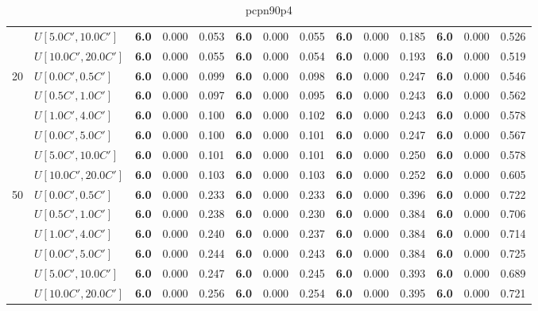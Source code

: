 \begin{table}[h]
{\begin{tabular}{|l|l||l|l|l||l|l|l||l|l|l||l|l|l|}
       & $U[5.0C',10.0C']$ & \textbf{6.0} & 0.000 & 0.053 & \textbf{6.0} & 0.000 & 0.055 & \textbf{6.0} & 0.000 & 0.185 & \textbf{6.0} & 0.000 & 0.526 \\
       & $U[10.0C',20.0C']$ & \textbf{6.0} & 0.000 & 0.055 & \textbf{6.0} & 0.000 & 0.054 & \textbf{6.0} & 0.000 & 0.193 & \textbf{6.0} & 0.000 & 0.519 \\
      \hline\hline
      \multirow{6}{*}{20} & $U[0.0C',0.5C']$ & \textbf{6.0} & 0.000 & 0.099 & \textbf{6.0} & 0.000 & 0.098 & \textbf{6.0} & 0.000 & 0.247 & \textbf{6.0} & 0.000 & 0.546 \\
       & $U[0.5C',1.0C']$ & \textbf{6.0} & 0.000 & 0.097 & \textbf{6.0} & 0.000 & 0.095 & \textbf{6.0} & 0.000 & 0.243 & \textbf{6.0} & 0.000 & 0.562 \\
       & $U[1.0C',4.0C']$ & \textbf{6.0} & 0.000 & 0.100 & \textbf{6.0} & 0.000 & 0.102 & \textbf{6.0} & 0.000 & 0.243 & \textbf{6.0} & 0.000 & 0.578 \\
       & $U[0.0C',5.0C']$ & \textbf{6.0} & 0.000 & 0.100 & \textbf{6.0} & 0.000 & 0.101 & \textbf{6.0} & 0.000 & 0.247 & \textbf{6.0} & 0.000 & 0.567 \\
       & $U[5.0C',10.0C']$ & \textbf{6.0} & 0.000 & 0.101 & \textbf{6.0} & 0.000 & 0.101 & \textbf{6.0} & 0.000 & 0.250 & \textbf{6.0} & 0.000 & 0.578 \\
       & $U[10.0C',20.0C']$ & \textbf{6.0} & 0.000 & 0.103 & \textbf{6.0} & 0.000 & 0.103 & \textbf{6.0} & 0.000 & 0.252 & \textbf{6.0} & 0.000 & 0.605 \\
      \hline\hline
      \multirow{6}{*}{50} & $U[0.0C',0.5C']$ & \textbf{6.0} & 0.000 & 0.233 & \textbf{6.0} & 0.000 & 0.233 & \textbf{6.0} & 0.000 & 0.396 & \textbf{6.0} & 0.000 & 0.722 \\
       & $U[0.5C',1.0C']$ & \textbf{6.0} & 0.000 & 0.238 & \textbf{6.0} & 0.000 & 0.230 & \textbf{6.0} & 0.000 & 0.384 & \textbf{6.0} & 0.000 & 0.706 \\
       & $U[1.0C',4.0C']$ & \textbf{6.0} & 0.000 & 0.240 & \textbf{6.0} & 0.000 & 0.237 & \textbf{6.0} & 0.000 & 0.384 & \textbf{6.0} & 0.000 & 0.714 \\
       & $U[0.0C',5.0C']$ & \textbf{6.0} & 0.000 & 0.244 & \textbf{6.0} & 0.000 & 0.243 & \textbf{6.0} & 0.000 & 0.384 & \textbf{6.0} & 0.000 & 0.725 \\
       & $U[5.0C',10.0C']$ & \textbf{6.0} & 0.000 & 0.247 & \textbf{6.0} & 0.000 & 0.245 & \textbf{6.0} & 0.000 & 0.393 & \textbf{6.0} & 0.000 & 0.689 \\
       & $U[10.0C',20.0C']$ & \textbf{6.0} & 0.000 & 0.256 & \textbf{6.0} & 0.000 & 0.254 & \textbf{6.0} & 0.000 & 0.395 & \textbf{6.0} & 0.000 & 0.721 \\
      \hline
      \end{tabular}
      }
      \caption{pcpn90p4}
      \label{tab:pcpn90p4}\end{table}
      
